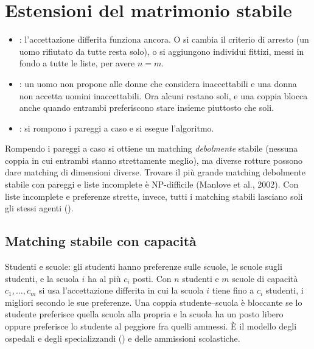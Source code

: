 \section{Estensioni del matrimonio stabile}

\begin{itemize}
  \item {}: l'accettazione differita funziona
        ancora. O si cambia il criterio di arresto (un uomo rifiutato da tutte resta
        solo), o si aggiungono individui fittizi, messi in fondo a tutte le liste, per avere
        $n = m$.
  \item {}: un uomo non propone alle donne che considera inaccettabili e
        una donna non accetta uomini inaccettabili. Ora alcuni restano soli, e una coppia
        blocca anche quando entrambi preferiscono stare insieme piuttosto che soli.
  \item {}: si rompono i pareggi a caso e si esegue l'algoritmo.
\end{itemize}

\begin{extra}
Rompendo i pareggi a caso si ottiene un matching \emph{debolmente} stabile (nessuna coppia
in cui entrambi stanno strettamente meglio), ma diverse rotture possono dare matching di
dimensioni diverse. Trovare il più grande matching debolmente stabile con pareggi e liste
incomplete è NP-difficile (Manlove et al., 2002). Con liste incomplete e preferenze strette,
invece, tutti i matching stabili lasciano soli gli stessi agenti ().
\end{extra}

\subsection{Matching stabile con capacità}

Studenti e scuole: gli studenti hanno preferenze sulle scuole, le scuole sugli studenti, e
la scuola $i$ ha al più $c_i$ posti. Con $n$ studenti e $m$ scuole di capacità
$c_1, \dots, c_m$ si usa l'accettazione differita in cui la scuola $i$ tiene fino a $c_i$
studenti, i migliori secondo le sue preferenze. Una coppia studente--scuola è bloccante se
lo studente preferisce quella scuola alla propria e la scuola ha un posto libero oppure
preferisce lo studente al peggiore fra quelli ammessi. È il modello degli ospedali e degli
specializzandi () e delle ammissioni scolastiche.

